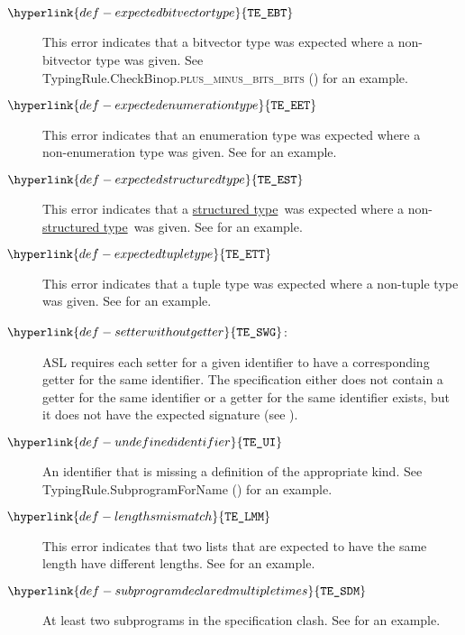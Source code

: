 \documentclass{book}
\newcommand\typingrulecasename[2]{TypingRule.{#1}.\textsc{#2}}
\newcommand\structuredtype[0]{\hyperlink{def-structuredtype}{structured type}}
\newcommand\TypeErrorCode[1]{\texttt{TE\_#1}}
\newcommand\UndefinedIdentifier[0]{\hyperlink{def-undefinedidentifier}{\TypeErrorCode{UI}}}
\newcommand\LengthsMismatch[0]{\hyperlink{def-lengthsmismatch}{\TypeErrorCode{LMM}}}
\newcommand\SetterWithoutGetter[0]{\hyperlink{def-setterwithoutgetter}{\TypeErrorCode{SWG}}}
\newcommand\ExpectedBitvectorType[0]{\hyperlink{def-expectedbitvectortype}{\TypeErrorCode{EBT}}}
\newcommand\SubrogramDeclaredMultipleTimes[0]{\hyperlink{def-subprogramdeclaredmultipletimes}{\TypeErrorCode{SDM}}}
\newcommand\ExpectedStructuredType[0]{\hyperlink{def-expectedstructuredtype}{\TypeErrorCode{EST}}}
\newcommand\ExpectedTupleType[0]{\hyperlink{def-expectedtupletype}{\TypeErrorCode{ETT}}}
\newcommand\ExpectedEnumerationType[0]{\hyperlink{def-expectedenumerationtype}{\TypeErrorCode{EET}}}
\begin{document}
\begin{description}
\hypertarget{def-expectedbitvectortype}{}
\item[$\ExpectedBitvectorType$]
This error indicates that a bitvector type was expected where a non-bitvector type was given.
See \typingrulecasename{CheckBinop}{plus\_minus\_bits\_bits} () for an example.

\hypertarget{def-expectedenumerationtype}{}
\item[$\ExpectedEnumerationType$]
This error indicates that an enumeration type was expected where a \\
non-enumeration type was given.
See  for an example.

\hypertarget{def-expectedstructuredtype}{}
\item[$\ExpectedStructuredType$]
This error indicates that a \structuredtype\ was expected where a non-\structuredtype\ was given.
See  for an example.

\hypertarget{def-expectedtupletype}{}
\item[$\ExpectedTupleType$]
This error indicates that a tuple type was expected where a non-tuple type was given.
See  for an example.

\hypertarget{def-setterwithoutgetter}{}
\item[$\SetterWithoutGetter$:]
ASL requires each setter for a given identifier to have a corresponding getter for the same
identifier.
The specification either does not contain a getter for the same identifier
or a getter for the same identifier exists, but it does not have the expected
signature (see ).

\hypertarget{def-undefinedidentifier}{}
\item[$\UndefinedIdentifier$]
An identifier that is missing a definition of the appropriate kind.
See TypingRule.SubprogramForName () for an example.

\hypertarget{def-lengthsmismatch}{}
\item[$\LengthsMismatch$]
This error indicates that two lists that are expected to have the same length have different lengths.
See  for an example.

\hypertarget{def-subprogramdeclaredmultipletimes}{}
\item[$\SubrogramDeclaredMultipleTimes$]
At least two subprograms in the specification clash.
See  for an example.


\end{description}
\end{document}
